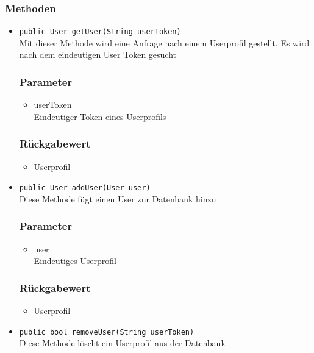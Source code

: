 \documentclass[a4paper]{scrreprt}
\begin{document}
\subsubsection*{Methoden}
\begin{addmargin}[25pt]{0pt}
\begin{itemize}

\item \texttt{public User getUser(String userToken)}\\
	Mit dieser Methode wird eine Anfrage nach einem Userprofil gestellt. Es wird nach dem eindeutigen User Token gesucht
	\subsubsection*{Parameter}
	\begin{itemize}
	\item userToken \\
		Eindeutiger Token eines Userprofils
	\end{itemize}
	\subsubsection*{Rückgabewert}
	\begin{itemize}
	\item Userprofil
	\end{itemize}

\item \texttt{public User addUser(User user)}\\
	Diese Methode fügt einen User zur Datenbank hinzu
	\subsubsection*{Parameter}
	\begin{itemize}
	\item user \\
		Eindeutiges Userprofil
	\end{itemize}
	\subsubsection*{Rückgabewert}
	\begin{itemize}
	\item Userprofil
	\end{itemize}
	
\item \texttt{public bool removeUser(String userToken)}\\
	Diese Methode löscht ein Userprofil aus der Datenbank

\end{itemize}
\end{addmargin}
\end{document}
